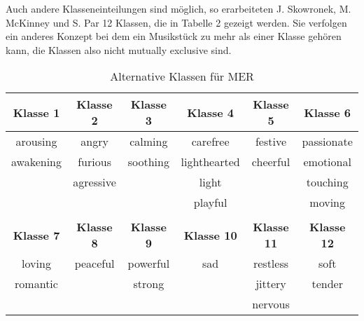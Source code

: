 \documentclass[11pt,a4paper]{article}
\begin{document}
Auch andere Klasseneinteilungen sind möglich, so erarbeiteten J. Skowronek, M. McKinney und S. Par  \cite{7cd5f337a4b030e3fafd0b4bc7e0976ff7cc1ec8c28d583c5dab695e0ee78941} 12 Klassen, die in Tabelle 2 gezeigt werden. Sie verfolgen ein anderes Konzept bei dem ein Musikstück zu mehr als einer Klasse gehören kann, die Klassen also nicht mutually exclusive sind.
\begin{center}
\begin{table}[h!]
\begin{tabular}{c c c c c c}
\textbf{Klasse 1} & \textbf{Klasse 2} & \textbf{Klasse 3} & \textbf{Klasse 4} & \textbf{Klasse 5} & \textbf{Klasse 6} \\
\hline
arousing  & angry     & calming  & carefree     & festive  & passionate \\
awakening & furious   & soothing & lighthearted & cheerful & emotional \\
          & agressive &          & light        &          & touching    \\
          &           &          & playful      &          & moving      \\
\vspace{10pt}\\
\textbf{Klasse 7} & \textbf{Klasse 8} & \textbf{Klasse 9} & \textbf{Klasse 10} & \textbf{Klasse 11} & \textbf{Klasse 12}\\
\hline
loving   & peaceful & powerful & sad & restless & soft\\
romantic &          & strong   &     & jittery  & tender\\
         &          &          &     & nervous  & \\
\end{tabular}
\caption[Alternative Music Emotion Recognition Klassen]{Alternative Klassen für MER}
\end{table}
\end{center}
\end{document}
